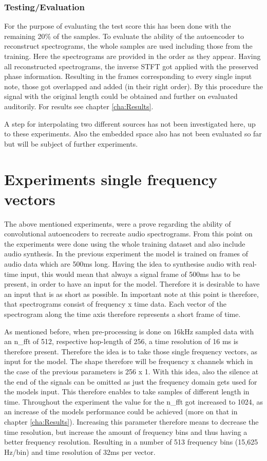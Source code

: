 \subsubsection{Testing/Evaluation}
For the purpose of evaluating the test score this has been done with the remaining 20\% of the samples. To evaluate the ability of the autoencoder to reconstruct spectrograms, the whole samples are used including those from the training. Here the spectrograms are provided in the order as they appear. Having all reconstructed spectrograms, the inverse STFT got applied with the preserved phase information. Resulting in the frames corresponding to every single input note, those got overlapped and added (in their right order). By this procedure the signal with the original length could be obtained and further on evaluated auditorily. For results see chapter \ref{cha:Results}. 

A step for interpolating two different sources has not been investigated here, up to these experiments. Also the embedded space also has not been evaluated so far but will be subject of further experiments.

\section{Experiments single frequency vectors}
The above mentioned experiments, were a prove regarding the ability of convolutional autoencoders to recreate audio spectrograms. From this point on the experiments were done using the whole training dataset and also include audio synthesis. In the previous experiment the model is trained on frames of audio data which are 500ms long. Having the idea to synthesise audio with real-time input, this would mean that always a signal frame of 500ms has to be present, in order to have an input for the model. Therefore it is desirable to have an input that is as short as possible. In important note at this point is therefore, that spectrograms consist of frequency x time data. Each vector of the spectrogram along the time axis therefore represents a short frame of time. 

As mentioned before, when pre-processing is done on 16kHz sampled data with an n\_fft of 512, respective hop-length of 256, a time resolution of 16 ms is therefore present. Therefore the idea is to take those single frequency vectors, as input for the model. The shape therefore will be frequency x channels which in the case of the previous parameters is 256 x 1. With this idea, also the silence at the end of the signals can be omitted as just the frequency domain gets used for the models input. This therefore enables to take samples of different length in time. Throughout the experiment the value for the n\_fft got increased to 1024, as an increase of the models performance could be achieved (more on that in chapter \ref{cha:Results}). Increasing this parameter therefore means to decrease the time resolution, but increase the amount of frequency bins and thus having a better frequency resolution. Resulting in a number of 513 frequency bins (15,625 Hz/bin) and time resolution of 32ms per vector.


